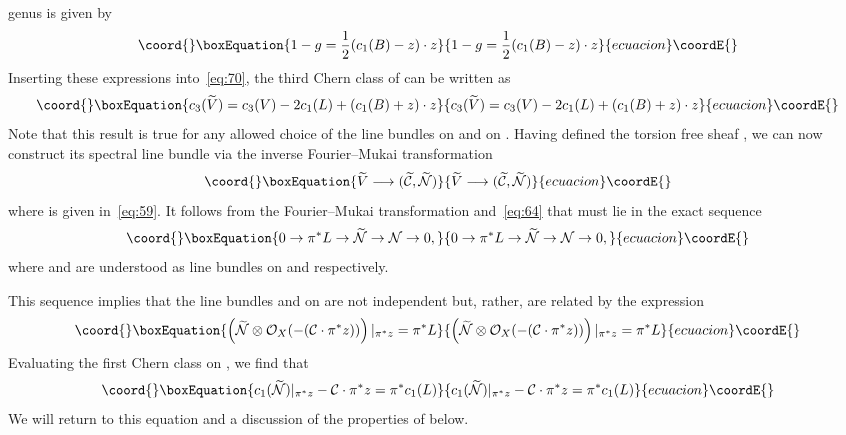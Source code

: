\documentclass[a4paper,12pt]{article}
\numberwithin{equation}{section}
\def\cC{{\mathcal C}}
\def\cN{{\mathcal N}}
\def\cO{{\mathcal O}}
\theoremstyle{plain}
\begin{document}
genus is given by 
\begin{equation}\coord{}\boxEquation{
1-g=\frac{1}{2}(c_{1}(B)-z)\cdot z
\label{eq:71B}
}{
1-g=\frac{1}{2}(c_{1}(B)-z)\cdot z
}{ecuacion}\coordE{}\end{equation}
Inserting these expressions into~\eqref{eq:70}, the third Chern
class of \coordHE{} can be written as
\begin{equation}\coord{}\boxEquation{
c_{3}(\widetilde{V})=c_{3}(V)-2c_{1}(L) +(c_{1}(B)+z)\cdot z
\label{eq:71C}
}{
c_{3}(\widetilde{V})=c_{3}(V)-2c_{1}(L) +(c_{1}(B)+z)\cdot z
}{ecuacion}\coordE{}\end{equation}
Note that this result is true for any allowed choice of the line bundles
\myHighlight{$\cN$}\coordHE{} on \myHighlight{$\cC$}\coordHE{} and \coordHE{} on \coordHE{}. Having defined the torsion free sheaf 
\coordHE{}, we can now construct its spectral line bundle 
\myHighlight{$\widetilde{\cN}$}\coordHE{} via the
inverse Fourier--Mukai transformation
\begin{equation}\coord{}\boxEquation{
\widetilde{V} \longrightarrow (\widetilde{\cC},\widetilde{\cN})
\label{eq:72}
}{
\widetilde{V} \longrightarrow (\widetilde{\cC},\widetilde{\cN})
}{ecuacion}\coordE{}\end{equation}
where \myHighlight{$\widetilde{\cC}$}\coordHE{} is given in~\eqref{eq:59}. It follows
from the Fourier--Mukai transformation and~\eqref{eq:64} 
that \myHighlight{$\widetilde{\cN}$}\coordHE{} must lie in the exact sequence
\begin{equation}\coord{}\boxEquation{
0 \rightarrow \pi^{*}L \rightarrow \widetilde{\cN} \rightarrow 
\cN \rightarrow 0,
\label{eq:73}
}{
0 \rightarrow \pi^{*}L \rightarrow \widetilde{\cN} \rightarrow 
\cN \rightarrow 0,
}{ecuacion}\coordE{}\end{equation}
where \myHighlight{$\cN$}\coordHE{} and \myHighlight{$\widetilde{\cN}$}\coordHE{} are understood as line bundles on
\myHighlight{$\cC$}\coordHE{} and \myHighlight{$\widetilde{\cC}$}\coordHE{} respectively.

This sequence implies that the line bundles \myHighlight{$\widetilde{\cN}$}\coordHE{} and
\coordHE{}  on \coordHE{} are not 
independent but, rather, are related by the expression
\begin{equation}\coord{}\boxEquation{
\left(\widetilde{\cN} \otimes \cO_{X}(-(\cC \cdot \pi^{*}z))
\right)|_{\pi^{*}z}=\pi^{*}L
\label{eq:74}
}{
\left(\widetilde{\cN} \otimes \cO_{X}(-(\cC \cdot \pi^{*}z))
\right)|_{\pi^{*}z}=\pi^{*}L
}{ecuacion}\coordE{}\end{equation}
Evaluating the first Chern class on \coordHE{}, we find that
\begin{equation}\coord{}\boxEquation{
c_{1}(\widetilde{\cN})|_{\pi^{*}z} -\cC \cdot \pi^{*}z= \pi^{*}c_{1}(L)
\label{eq:75}
}{
c_{1}(\widetilde{\cN})|_{\pi^{*}z} -\cC \cdot \pi^{*}z= \pi^{*}c_{1}(L)
}{ecuacion}\coordE{}\end{equation}
We will return to this equation and a
discussion of the properties of \myHighlight{$\widetilde{\cN}$}\coordHE{} below.
\end{document}
